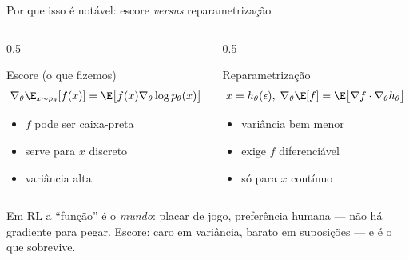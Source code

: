 \documentclass[aspectratio=169, 11pt]{beamer}
\newcommand{\thv}{\theta}                       %
\newcommand{\gth}{\nabla_{\thv}}                %
\begin{document}
\begin{frame}{Por que isso é notável: escore \emph{versus} reparametrização}

  \begin{columns}[T]
  \begin{column}{0.5\textwidth}
    \begin{defbox}{Escore (o que fizemos)}
      \vspace{-0.8em}
      \[ \gth \E_{x\sim p_{\thv}}[f(x)] = \E\bigl[f(x)\gth \log p_{\thv}(x)\bigr] \]
      \vspace{-1.6em}
      \begin{itemize}\setlength{\itemsep}{0.1ex}
        \item[$+$] $f$ pode ser caixa-preta
        \item[$+$] serve para $x$ discreto
        \item[$-$] variância alta
      \end{itemize}
    \end{defbox}
  \end{column}
  \begin{column}{0.5\textwidth}
    \begin{defbox}{Reparametrização}
      \vspace{-0.8em}
      \[ x = h_{\thv}(\epsilon),\; \gth \E[f] = \E\bigl[\nabla f \cdot \gth h_{\thv}\bigr] \]
      \vspace{-1.6em}
      \begin{itemize}\setlength{\itemsep}{0.1ex}
        \item[$+$] variância bem menor
        \item[$-$] exige $f$ diferenciável
        \item[$-$] só para $x$ contínuo
      \end{itemize}
    \end{defbox}
  \end{column}
  \end{columns}

  \begin{ideiabox}
    Em RL a ``função'' é o \emph{mundo}: placar de jogo, preferência humana ---
    não há gradiente para pegar. Escore: caro em variância, barato em
    suposições --- e é o que sobrevive.
  \end{ideiabox}
\end{frame}
\end{document}
